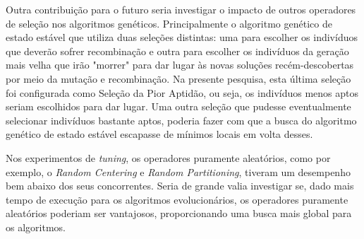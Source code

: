 Outra contribuição para o futuro seria investigar o impacto de outros operadores 
de seleção nos algoritmos genéticos. Principalmente o algoritmo genético de 
estado estável que utiliza duas seleções distintas: uma para escolher os 
indivíduos que deverão sofrer recombinação e outra para escolher os indivíduos 
da geração mais velha que irão "morrer" para dar lugar às novas soluções 
recém-descobertas por meio da mutação e recombinação. Na presente pesquisa, 
esta última seleção foi configurada como Seleção da Pior Aptidão, ou seja, os 
indivíduos menos aptos seriam escolhidos para dar lugar. Uma outra seleção 
que pudesse eventualmente selecionar indivíduos bastante aptos, poderia fazer 
com que a busca do algoritmo genético de estado estável escapasse de mínimos 
locais em volta desses.

Nos experimentos de \textit{tuning}, os operadores puramente aleatórios, como 
por exemplo, o \textit{Random Centering} e \textit{Random Partitioning}, tiveram 
um desempenho bem abaixo dos seus concorrentes. Seria de grande valia investigar 
se, dado mais tempo de execução para os algoritmos evolucionários, os operadores 
puramente aleatórios poderiam ser vantajosos, proporcionando uma busca mais 
global para os algoritmos.